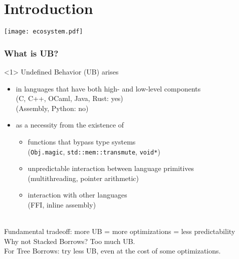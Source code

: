\begin{frame}
    \titlepage
\end{frame}

\section{Introduction}

\begin{frame}
    \texttt{[image: ecosystem.pdf]}
\end{frame}

\begin{frame}[fragile,t]
    \frametitle{What is UB?}
    \begin{onlyenv}<1>
        Undefined Behavior (UB) arises
        \begin{itemize}
            \item in languages that have both high- and low-level components\\
                (C, C++, OCaml, Java, Rust: yes)\\
                (Assembly, Python: no)
            \item as a necessity from the existence of
                \begin{itemize}
                    \item functions that bypass type systems\\
                        (\texttt{Obj.magic}, \texttt{std::mem::transmute}, \texttt{void*})
                    \item unpredictable interaction between language primitives\\
                        (multithreading, pointer arithmetic)
                    \item interaction with other languages\\
                        (FFI, inline assembly)
                \end{itemize}
        \end{itemize}~\\
        Fundamental tradeoff: more UB = more optimizations = less predictability\\
        Why not Stacked Borrows? Too much UB.\\
        For Tree Borrows: try less UB, even at the cost of some optimizations.
    \end{onlyenv}


\end{frame}
